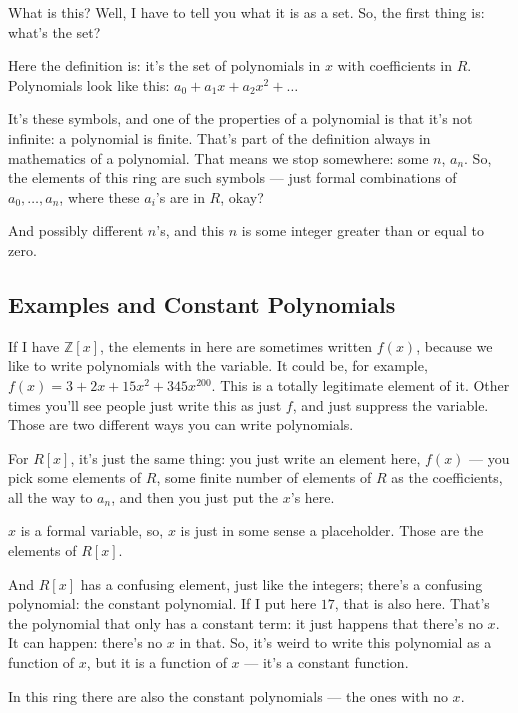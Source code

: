 \begin{speech}[01:18:05 - 01:19:08]
What is this? Well, I have to tell you what it is as a set. So, the first thing is: what's the set? 

Here the definition is: it's the set of polynomials in $x$ with coefficients in $R$. Polynomials look like this: $a_0 + a_1 x + a_2 x^2 + \dots$ 

It's these symbols, and one of the properties of a polynomial is that it's not infinite: a polynomial is finite. That's part of the definition always in mathematics of a polynomial. That means we stop somewhere: some $n$, $a_n$. So, the elements of this ring are such symbols --- just formal combinations of $a_0, \dots, a_n$, where these $a_i$'s are in $R$, okay? 

And possibly different $n$'s, and this $n$ is some integer greater than or equal to zero.
\end{speech}

\subsection{Examples and Constant Polynomials}

\begin{speech}[01:19:08 - 01:20:48]
If I have $\mathbb{Z}[x]$,  the elements in here are sometimes written $f(x)$, because we like to write polynomials with the variable. It could be, for example, $f(x) = 3 + 2x + 15x^2 + 345x^{200}$.  This is a totally legitimate element of it. Other times you'll see people just write this as just $f$, and just suppress the variable.  Those are two different ways you can write polynomials.

For $R[x]$, it's just the same thing: you just write an element here, $f(x)$  --- you pick some elements of $R$, some finite number of elements of $R$ as the coefficients, all the way to $a_n$, and then you just put the $x$'s here.

$x$ is a formal variable, so, $x$ is just in some sense a placeholder. Those are the elements of $R[x]$.

And $R[x]$ has a confusing element, just like the integers; there's a confusing polynomial: the constant polynomial. If I put here $17$,  that is also here. That's the polynomial that only has a constant term: it just happens that there's no $x$. It can happen: there's no $x$ in that. So, it's weird to write this polynomial as a function of $x$, but it is a function of $x$ --- it's a constant function.

In this ring there are also the constant polynomials --- the ones with no $x$.
\end{speech}

